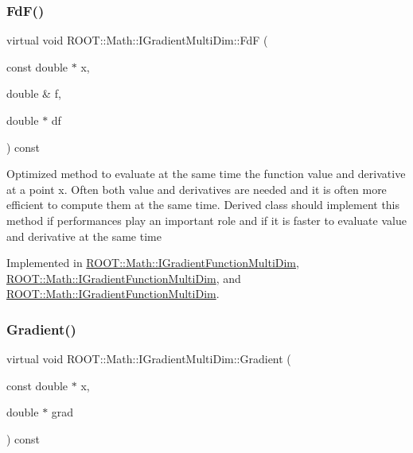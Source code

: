 \mbox{\label{classROOT_1_1Math_1_1IGradientMultiDim_ad8d0e31b786327014524483a708d8f82}} 
\subsubsection{\texorpdfstring{FdF()}{FdF()}\hspace{0.1cm}{\footnotesize\ttfamily [3/3]}}
{\footnotesize\ttfamily virtual void R\+O\+O\+T\+::\+Math\+::\+I\+Gradient\+Multi\+Dim\+::\+FdF (\begin{DoxyParamCaption}\item[{const double $\ast$}]{x,  }\item[{double \&}]{f,  }\item[{double $\ast$}]{df }\end{DoxyParamCaption}) const\hspace{0.3cm}{\ttfamily [pure virtual]}}

Optimized method to evaluate at the same time the function value and derivative at a point x. Often both value and derivatives are needed and it is often more efficient to compute them at the same time. Derived class should implement this method if performances play an important role and if it is faster to evaluate value and derivative at the same time 

Implemented in \mbox{\hyperlink{classROOT_1_1Math_1_1IGradientFunctionMultiDim_a58cefd2806ec7b9d389911800ed60386}{R\+O\+O\+T\+::\+Math\+::\+I\+Gradient\+Function\+Multi\+Dim}}, \mbox{\hyperlink{classROOT_1_1Math_1_1IGradientFunctionMultiDim_a58cefd2806ec7b9d389911800ed60386}{R\+O\+O\+T\+::\+Math\+::\+I\+Gradient\+Function\+Multi\+Dim}}, and \mbox{\hyperlink{classROOT_1_1Math_1_1IGradientFunctionMultiDim_a58cefd2806ec7b9d389911800ed60386}{R\+O\+O\+T\+::\+Math\+::\+I\+Gradient\+Function\+Multi\+Dim}}.

\mbox{\label{classROOT_1_1Math_1_1IGradientMultiDim_ac5785e2df4fa36061bf9ddbb9ce4dde0}} 
\subsubsection{\texorpdfstring{Gradient()}{Gradient()}\hspace{0.1cm}{\footnotesize\ttfamily [1/3]}}
{\footnotesize\ttfamily virtual void R\+O\+O\+T\+::\+Math\+::\+I\+Gradient\+Multi\+Dim\+::\+Gradient (\begin{DoxyParamCaption}\item[{const double $\ast$}]{x,  }\item[{double $\ast$}]{grad }\end{DoxyParamCaption}) const\hspace{0.3cm}{\ttfamily [pure virtual]}}

